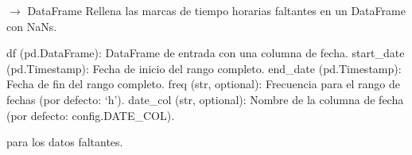 \documentclass[letterpaper,10pt,english]{sphinxmanual}
\begin{document}

\begin{fulllineitems}
\label{\detokenize{pampaneira_imputation:pampaneira_imputation.data_preprocessor.fill_missing_timestamps}}
\pysigstartsignatures
\pysiglinewithargsret
{}
{\sphinxparamcomma {}\sphinxparamcomma {}\sphinxparamcomma {}\sphinxparamcomma {}}
{{ $\rightarrow$ DataFrame}}
\pysigstopsignatures
\sphinxAtStartPar
Rellena las marcas de tiempo horarias faltantes en un DataFrame con NaNs.
\begin{description}
\sphinxAtStartPar
df (pd.DataFrame): DataFrame de entrada con una columna de fecha.
start\_date (pd.Timestamp): Fecha de inicio del rango completo.
end\_date (pd.Timestamp): Fecha de fin del rango completo.
freq (str, optional): Frecuencia para el rango de fechas (por defecto: ‘h’).
date\_col (str, optional): Nombre de la columna de fecha (por defecto: config.DATE\_COL).

\begin{description}
\sphinxAtStartPar
para los datos faltantes.

\end{description}

\end{description}

\end{fulllineitems}

\end{document}
